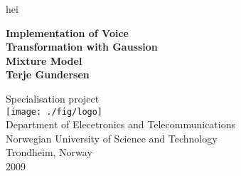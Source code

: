 \begin{titlepage}
 
\begin{center}
 
\color{white} hei\\[1cm]
\color{black}

{ \huge \textbf{Implementation of Voice\\[0.2cm] Transformation with Gaussion\\[0.5cm] Mixture Model}}\\[3cm]


 
{\LARGE \bf Terje Gundersen}
 
\vfill

\large Specialisation project \\[1.5cm]

\texttt{[image: ./fig/logo]}\\[0.5cm]
 



\large Department of Elecetronics and Telecommunications\\
Norwegian University of Science and Technology\\
Trondheim, Norway\\[0.5cm]


2009
 
\end{center}
 
\end{titlepage}
